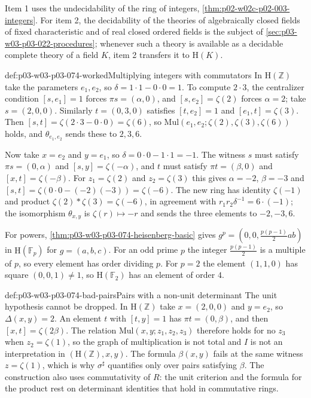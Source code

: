 Item 1 uses the undecidability of the ring of integers,
\cref{thm:p02-w02c-p02-003-integers}. For item 2, the decidability of the
theories of algebraically closed fields of fixed characteristic and of real
closed ordered fields is the subject of
\cref{sec:p03-w03-p03-022-procedures}; whenever such a theory is available
as a decidable complete theory of a field \(K\), item 2 transfers it to
\(\mathrm H(K)\).

\begin{hbexample}{def:p03-w03-p03-074-worked}{Multiplying integers with commutators}
In \(\mathrm H(\mathbb Z)\) take the parameters \(e_1,e_2\), so
\(\delta=1\cdot1-0\cdot0=1\). To compute \(2\cdot3\), the centralizer
condition \([s,e_1]=1\) forces \(\pi s=(\alpha,0)\), and \([s,e_2]=\zeta(2)\)
forces \(\alpha=2\); take \(s=(2,0,0)\). Similarly \(t=(0,3,0)\) satisfies
\([t,e_2]=1\) and \([e_1,t]=\zeta(3)\). Then
\([s,t]=\zeta(2\cdot3-0\cdot0)=\zeta(6)\), so
\(\mathrm{Mul}(e_1,e_2;\zeta(2),\zeta(3),\zeta(6))\) holds, and
\(\theta_{e_1,e_2}\) sends these to \(2,3,6\).

Now take \(x=e_2\) and \(y=e_1\), so \(\delta=0\cdot0-1\cdot1=-1\). The
witness \(s\) must satisfy \(\pi s=(0,\alpha)\) and
\([s,y]=\zeta(-\alpha)\), and \(t\) must satisfy \(\pi t=(\beta,0)\) and
\([x,t]=\zeta(-\beta)\). For \(z_1=\zeta(2)\) and \(z_2=\zeta(3)\) this
gives \(\alpha=-2\), \(\beta=-3\) and
\([s,t]=\zeta(0\cdot0-(-2)(-3))=\zeta(-6)\). The new ring has identity
\(\zeta(-1)\) and product \(\zeta(2)\ast\zeta(3)=\zeta(-6)\), in
agreement with \(r_1r_2\delta^{-1}=6\cdot(-1)\); the isomorphism
\(\theta_{x,y}\) is \(\zeta(r)\mapsto-r\) and sends the three elements to
\(-2,-3,6\).

For powers, \cref{thm:p03-w03-p03-074-heisenberg-basic} gives
\(g^p=(0,0,\tfrac{p(p-1)}2ab)\) in \(\mathrm H(\mathbb F_p)\) for
\(g=(a,b,c)\). For an odd prime \(p\) the integer \(\tfrac{p(p-1)}2\) is
a multiple of \(p\), so every element has order dividing \(p\). For
\(p=2\) the element \((1,1,0)\) has square \((0,0,1)\neq1\), so
\(\mathrm H(\mathbb F_2)\) has an element of order \(4\).
\end{hbexample}

\begin{hbwarning}{def:p03-w03-p03-074-bad-pairs}{Pairs with a non-unit determinant}
The unit hypothesis cannot be dropped. In \(\mathrm H(\mathbb Z)\) take
\(x=(2,0,0)\) and \(y=e_2\), so \(\Delta(x,y)=2\). An element \(t\) with
\([t,y]=1\) has \(\pi t=(0,\beta)\), and then \([x,t]=\zeta(2\beta)\).
The relation \(\mathrm{Mul}(x,y;z_1,z_2,z_3)\) therefore holds for no
\(z_3\) when \(z_2=\zeta(1)\), so the graph of multiplication is not
total and \(I\) is not an interpretation in \((\mathrm H(\mathbb Z),x,y)\).
The formula \(\beta(x,y)\) fails at the same witness \(z=\zeta(1)\), which
is why \(\sigma^{\sharp}\) quantifies only over pairs satisfying
\(\beta\). The construction also uses commutativity of \(R\): the unit
criterion and the formula for the product rest on determinant identities
that hold in commutative rings.
\end{hbwarning}


